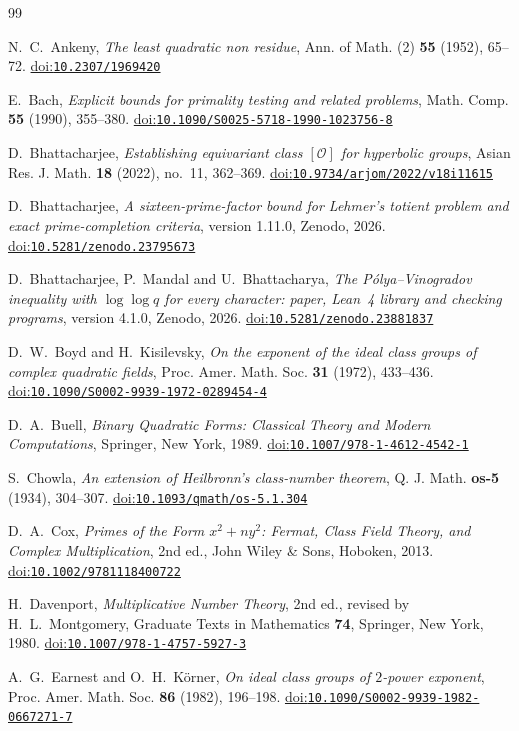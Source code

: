 \documentclass[11pt]{amsart}
\theoremstyle{definition}
\theoremstyle{remark}
\numberwithin{equation}{section}
\providecommand{\doi}[1]{\href{https://doi.org/#1}{doi:\nolinkurl{#1}}}
\begin{document}
\begingroup\raggedright
\begin{thebibliography}{99}

 N.~C.~Ankeny, \emph{The least quadratic non residue}, Ann. of Math. (2) \textbf{55} (1952), 65--72. \doi{10.2307/1969420}

 E.~Bach, \emph{Explicit bounds for primality testing and related problems}, Math. Comp. \textbf{55} (1990), 355--380. \doi{10.1090/S0025-5718-1990-1023756-8}

 D.~Bhattacharjee, \emph{Establishing equivariant class $[\mathcal O]$ for hyperbolic groups}, Asian Res. J. Math. \textbf{18} (2022), no.~11, 362--369. \doi{10.9734/arjom/2022/v18i11615}

 D.~Bhattacharjee, \emph{A sixteen-prime-factor bound for Lehmer's totient problem and exact prime-completion criteria}, version 1.11.0, Zenodo, 2026. \doi{10.5281/zenodo.23795673}

 D.~Bhattacharjee, P.~Mandal and U.~Bhattacharya, \emph{The P\'olya--Vinogradov inequality with $\log\log q$ for every character: paper, Lean~4 library and checking programs}, version 4.1.0, Zenodo, 2026. \doi{10.5281/zenodo.23881837}

 D.~W.~Boyd and H.~Kisilevsky, \emph{On the exponent of the ideal class groups of complex quadratic fields}, Proc. Amer. Math. Soc. \textbf{31} (1972), 433--436. \doi{10.1090/S0002-9939-1972-0289454-4}

 D.~A.~Buell, \emph{Binary Quadratic Forms: Classical Theory and Modern Computations}, Springer, New York, 1989. \doi{10.1007/978-1-4612-4542-1}

 S.~Chowla, \emph{An extension of Heilbronn's class-number theorem}, Q. J. Math. \textbf{os-5} (1934), 304--307. \doi{10.1093/qmath/os-5.1.304}

 D.~A.~Cox, \emph{Primes of the Form $x^2+ny^2$: Fermat, Class Field Theory, and Complex Multiplication}, 2nd ed., John Wiley \& Sons, Hoboken, 2013. \doi{10.1002/9781118400722}

 H.~Davenport, \emph{Multiplicative Number Theory}, 2nd ed., revised by H.~L.~Montgomery, Graduate Texts in Mathematics \textbf{74}, Springer, New York, 1980. \doi{10.1007/978-1-4757-5927-3}

 A.~G.~Earnest and O.~H.~K\"orner, \emph{On ideal class groups of $2$-power exponent}, Proc. Amer. Math. Soc. \textbf{86} (1982), 196--198. \doi{10.1090/S0002-9939-1982-0667271-7}


\end{thebibliography}
\end{document}
